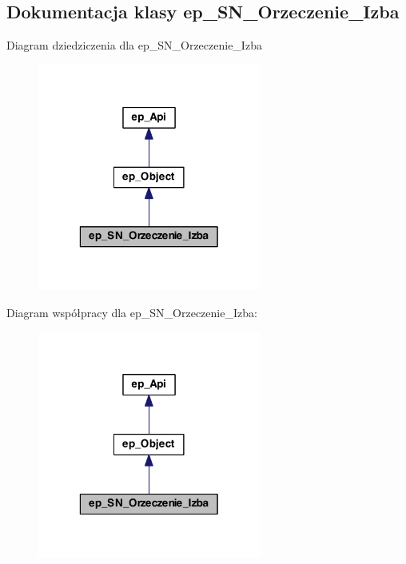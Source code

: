 \hypertarget{classep___s_n___orzeczenie___izba}{\subsection{Dokumentacja klasy ep\-\_\-\-S\-N\-\_\-\-Orzeczenie\-\_\-\-Izba}
\label{classep___s_n___orzeczenie___izba}
}


Diagram dziedziczenia dla ep\-\_\-\-S\-N\-\_\-\-Orzeczenie\-\_\-\-Izba\nopagebreak
\begin{figure}[H]
\begin{center}
\leavevmode
\includegraphics[width=208pt]{classep___s_n___orzeczenie___izba__inherit__graph}
\end{center}
\end{figure}


Diagram współpracy dla ep\-\_\-\-S\-N\-\_\-\-Orzeczenie\-\_\-\-Izba\-:\nopagebreak
\begin{figure}[H]
\begin{center}
\leavevmode
\includegraphics[width=208pt]{classep___s_n___orzeczenie___izba__coll__graph}
\end{center}
\end{figure}
